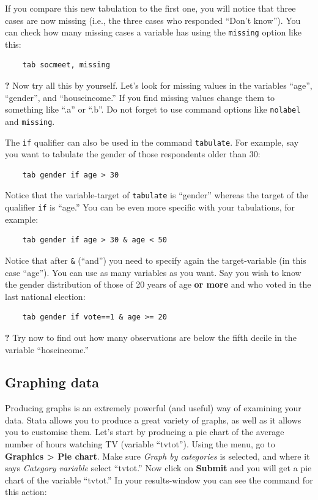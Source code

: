 If you compare this new tabulation to the first one, you will notice that three cases are now missing (i.e., the three cases who responded ``Don't know''). You can check how many missing cases a variable has using the \texttt{missing} option like this:

\begin{lstlisting}
	tab socmeet, missing
\end{lstlisting}  

\forceindent \textbf{?} Now try all this by yourself. Let's look for missing values in the variables ``age'', ``gender'', and ``houseincome.'' If you find missing values change them to something like ``.a'' or ``.b''. Do not forget to use command options like \texttt{nolabel} and \texttt{missing}.

The \texttt{if} qualifier can also be used in the command \texttt{tabulate}. For example, say you want to tabulate the gender of those respondents older than 30:

\begin{lstlisting}
	tab gender if age > 30
\end{lstlisting}
 
 Notice that the variable-target of \texttt{tabulate} is ``gender'' whereas the target of the qualifier \texttt{if} is ``age.'' You can be even more specific with your tabulations, for example:
 
\begin{lstlisting}
	tab gender if age > 30 & age < 50
\end{lstlisting}

Notice that after \texttt{\&} (``and'') you need to specify again the target-variable (in this case ``age''). You can use as many variables as you want. Say you wish to know the gender distribution of those of 20 years of age \textbf{or more} and who voted in the last national election:

\begin{lstlisting}
	tab gender if vote==1 & age >= 20
\end{lstlisting}

\forceindent \textbf{?} Try now to find out how many observations are below the fifth decile in the variable ``hoseincome.''

\subsection*{Graphing data}

Producing graphs is an extremely powerful (and useful) way of examining your data. Stata allows you to produce a great variety of graphs, as well as it allows you to customise them. Let's start by producing a pie chart of the average number of hours watching TV (variable ``tvtot''). Using the menu, go to \textbf{Graphics > Pie chart}. Make sure \textit{Graph by categories} is selected, and where it says \textit{Category variable} select ``tvtot.'' Now click on \textbf{Submit} and you will get a pie chart of the variable ``tvtot.'' In your results-window you can see the command for this action:

